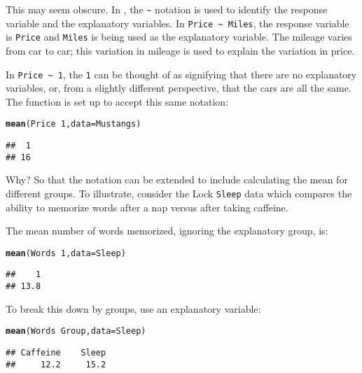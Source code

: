 \documentclass[11pt]{article}\usepackage[]{graphicx}\usepackage[]{color}
\makeatletter
\newcommand{\hlnum}[1]{\textcolor[rgb]{0.686,0.059,0.569}{#1}}%
\newcommand{\hlopt}[1]{\textcolor[rgb]{0,0,0}{#1}}%
\newcommand{\hlstd}[1]{\textcolor[rgb]{0.345,0.345,0.345}{#1}}%
\newcommand{\hlkwc}[1]{\textcolor[rgb]{0.333,0.667,0.333}{#1}}%
\newcommand{\hlkwd}[1]{\textcolor[rgb]{0.737,0.353,0.396}{\textbf{#1}}}%
\newenvironment{kframe}{%
 \def\at@end@of@kframe{}%
 \ifinner\ifhmode%
  \def\at@end@of@kframe{\end{minipage}}%
  \begin{minipage}{\columnwidth}%
 \fi\fi%
 \def\FrameCommand##1{\hskip\@totalleftmargin \hskip-\fboxsep
 \colorbox{shadecolor}{##1}\hskip-\fboxsep
     \hskip-\linewidth \hskip-\@totalleftmargin \hskip\columnwidth}%
 \MakeFramed {\advance\hsize-\width
   \@totalleftmargin\z@ \linewidth\hsize
   \@setminipage}}%
 {\par\unskip\endMakeFramed%
 \at@end@of@kframe}
\newenvironment{knitrout}{}{} %
\makeatother
\begin{document}
This may seem obscure.  In , the \verb+~+ notation is used to identify the
response variable and the explanatory variables.  In \verb+Price ~ Miles+, the response variable is \texttt{Price} and \texttt{Miles} is being used as the explanatory variable.  
The mileage varies from car to car; this variation in mileage is used to explain the variation in price.

In \verb+Price ~ 1+, the \texttt{1} can be thought of as signifying that there are no explanatory variables, or, from a slightly different perspective, that the cars are all the same. The  function is set up to accept this same notation:
\begin{knitrout}
\color{fgcolor}\begin{kframe}
\begin{alltt}
\hlkwd{mean}\hlstd{(Price} \hlopt{~} \hlnum{1}\hlstd{,} \hlkwc{data} \hlstd{= Mustangs)}
\end{alltt}
\begin{verbatim}
##  1 
## 16
\end{verbatim}
\end{kframe}
\end{knitrout}
Why?  So that the notation can be extended to include calculating the mean for different groups.  To illustrate, consider the Lock \texttt{Sleep} data which compares the ability to memorize words after a nap versus after taking caffeine.

The mean number of words memorized, ignoring the explanatory group, is:
\begin{knitrout}
\color{fgcolor}\begin{kframe}
\begin{alltt}
\hlkwd{mean}\hlstd{(Words} \hlopt{~} \hlnum{1}\hlstd{,} \hlkwc{data} \hlstd{= Sleep)}
\end{alltt}
\begin{verbatim}
##    1 
## 13.8
\end{verbatim}
\end{kframe}
\end{knitrout}
To break this down by groups, use an explanatory variable:
\begin{knitrout}
\color{fgcolor}\begin{kframe}
\begin{alltt}
\hlkwd{mean}\hlstd{(Words} \hlopt{~} \hlstd{Group,} \hlkwc{data} \hlstd{= Sleep)}
\end{alltt}
\begin{verbatim}
## Caffeine    Sleep 
##     12.2     15.2
\end{verbatim}
\end{kframe}
\end{knitrout}
\end{document}
